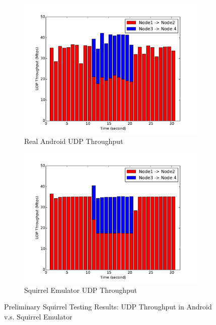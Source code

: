 \documentclass[12pt]{report}
\begin{document}
\begin{figure}[h]
  \begin{center}
    \begin{subfigure}[h]{0.48\textwidth}
      \includegraphics[width=\textwidth]{figures/results/effectiveness_android.pdf}
      \caption{\label{fig:squirrel_preliminary_android}Real Android UDP Throughput}
    \end{subfigure}
    \begin{subfigure}[h]{0.48\textwidth}
      \includegraphics[width=\textwidth]{figures/results//effectiveness_squirrel.pdf}
      \caption{\label{fig:squirrel_preliminary_squirrel}Squirrel Emulator UDP Throughput}
    \end{subfigure}
    \caption{\label{fig:squirrel_preliminary}Preliminary Squirrel Testing Results: UDP Throughput in Android v.s. Squirrel Emulator}
  \end{center}
\end{figure}
\end{document}
